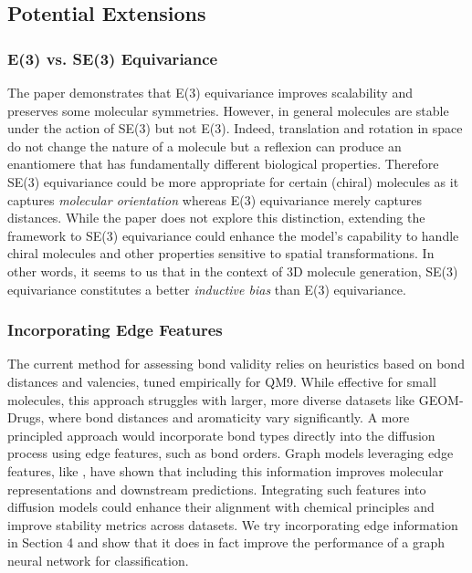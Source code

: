 \documentclass[sigconf]{acmart}
\begin{document}
\subsection{Potential Extensions}
\subsubsection{E(3) vs. SE(3) Equivariance}
The paper demonstrates that E(3) equivariance improves scalability and preserves some molecular symmetries. However, in general molecules are stable under the action of SE(3) but not E(3). Indeed, translation and rotation in space do not change the nature of a molecule but a reflexion can produce an enantiomere that has fundamentally different biological properties. Therefore SE(3) equivariance could be more appropriate for certain (chiral) molecules as it captures \textit{molecular orientation} whereas E(3) equivariance merely captures distances. While the paper does not explore this distinction, extending the framework to SE(3) equivariance could enhance the model’s capability to handle chiral molecules and other properties sensitive to spatial transformations. In other words, it seems to us that in the context of 3D molecule generation, SE(3) equivariance constitutes a better \textit{inductive bias} than E(3) equivariance.

\subsubsection{Incorporating Edge Features}
The current method for assessing bond validity relies on heuristics based on bond distances and valencies, tuned empirically for QM9. While effective for small molecules, this approach struggles with larger, more diverse datasets like GEOM-Drugs, where bond distances and aromaticity vary significantly. A more principled approach would incorporate bond types directly into the diffusion process using edge features, such as bond orders. Graph models leveraging edge features, like \cite{gilmer2017neuralmessagepassingquantum}, have shown that including this information improves molecular representations and downstream predictions. Integrating such features into diffusion models could enhance their alignment with chemical principles and improve stability metrics across datasets. We try incorporating edge information in Section 4 and show that it does in fact improve the performance of a graph neural network for classification.
\end{document}
